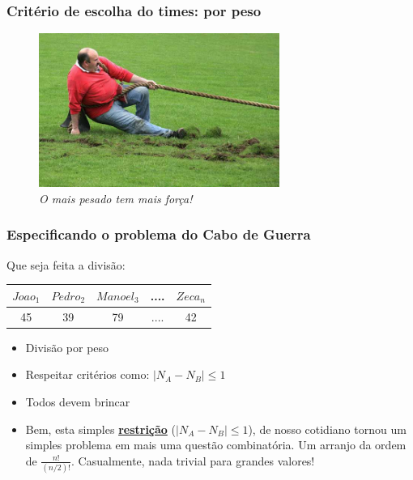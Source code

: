 \documentclass{beamer}
\begin{document}

\begin{frame}
\frametitle{Critério de escolha do times: por peso}

\begin{figure}[ht!]
 \centering
 \includegraphics[width=0.7\textwidth , height=0.7\textheight]{separar_por_peso02.jpg}
\caption{\textit{O mais pesado tem mais força!}} 
\end{figure}

\end{frame}


\begin{frame}
\frametitle{Especificando o problema do Cabo de Guerra}

\begin{block}{Que seja feita a divisão:}


 
\begin{center}
\begin{tabular}{|c|c|c|c|c|}
\hline
$Joao_1$ & $Pedro_2$ & $Manoel_3$ & .... & $Zeca_n$ \\ \hline
45 & 39 & 79 & .... & 42  \\ \hline
\end{tabular}
\end{center}

\begin{itemize}
\item Divisão  por peso
\item Respeitar  critérios como: $|N_A - N_B| \le 1$
\item Todos devem brincar

\item \textsf{Bem, esta simples {\bf \underline{restrição}} ({\bf $|N_A - N_B| \le 1$}), de nosso cotidiano tornou um simples problema em mais uma questão combinatória.
 Um arranjo da ordem de  $\frac{n!}{(n/2)!}$.
 Casualmente, nada trivial  para grandes valores! }
 \end{itemize}
 
\end{block}
\end{frame}
\end{document}
